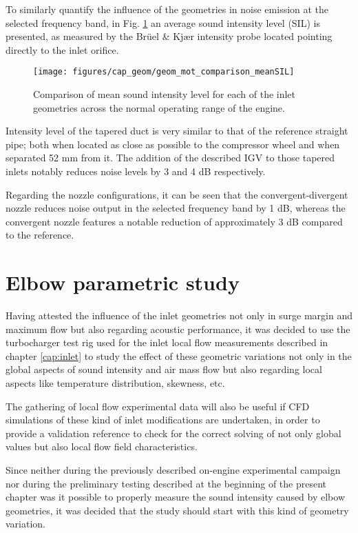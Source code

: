 To similarly quantify the influence of the geometries in noise emission at the selected frequency band, in Fig. \ref{fig:geom_mot_comparison_meanSIL} an average sound intensity level (SIL) is presented, as measured by the Brüel \& Kj\ae r intensity probe located pointing directly to the inlet orifice.

\begin{figure}[htb!]
\centering
\texttt{[image: figures/cap\_geom/geom\_mot\_comparison\_meanSIL]}
\caption[Comparison of mean sound intensity level]{Comparison of mean sound intensity level for each of the inlet geometries across the normal operating range of the engine.}
\label{fig:geom_mot_comparison_meanSIL}
\end{figure}

Intensity level of the tapered duct is very similar to that of the reference straight pipe; both when located as close as possible to the compressor wheel and when separated 52 mm from it. The addition of the described IGV to those tapered inlets notably reduces noise levels by 3 and 4 dB respectively. 

Regarding the nozzle configurations, it can be seen that the convergent-divergent nozzle reduces noise output in the selected frequency band by 1 dB, whereas the convergent nozzle features a notable reduction of approximately 3 dB compared to the reference.

\section{Elbow parametric study}
\label{sec:geom_elbows}

Having attested the influence of the inlet geometries not only in surge margin and maximum flow but also regarding acoustic performance, it was decided to use the turbocharger test rig used for the inlet local flow measurements described in chapter \ref{cap:inlet} to study the effect of these geometric variations not only in the global aspects of sound intensity and air mass flow but also regarding local aspects like temperature distribution, skewness, etc.

The gathering of local flow experimental data will also be useful if CFD simulations of these kind of inlet modifications are undertaken, in order to provide a validation reference to check for the correct solving of not only global values but also local flow field characteristics.

Since neither during the previously described on-engine experimental campaign nor during the preliminary testing described at the beginning of the present chapter was it possible to properly measure the sound intensity caused by elbow geometries, it was decided that the study should start with this kind of geometry variation.

